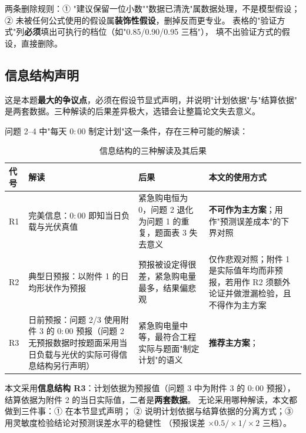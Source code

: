 \begin{guideblock}
两条删除规则：① "建议保留一位小数""数据已清洗"属数据处理，不是模型假设；
② 未被任何公式使用的假设属\textbf{装饰性假设}，删掉反而更专业。
表格的"验证方式"列\textbf{必须}填出可执行的档位（如"0.85/0.90/0.95 三档"），
填不出验证方式的假设，直接删除。
\end{guideblock}

\subsection{信息结构声明}

\begin{guideblock}
这是本题\textbf{最大的争议点}，必须在假设节显式声明，并说明"计划依据"与"结算依据"
是两套数据。三种解读的后果差异极大，选错会让整篇论文失去意义。
\end{guideblock}

问题 2--4 中"每天 \(0{:}00\) 制定计划"这一条件，存在三种可能的解读：

\begin{table}[htbp]
  \centering
  \caption{信息结构的三种解读及其后果}
  \label{tab:infostruct}
  \footnotesize
  \begin{tabularx}{\linewidth}{C{1.0cm} L{4.6cm} L{4.6cm} Y}
    \toprule
    代号 & 解读 & 后果 & 本文的使用方式 \\
    \midrule
    R1 & 完美信息：\(0{:}00\) 即知当日负载与光伏真值
       & 紧急购电恒为 0，问题 2 退化为问题 1 的重复，题面表 3 失去意义
       & \textbf{不可作为主方案}；用作"预测误差成本"的下界对照 \\
    \addlinespace
    R2 & 典型日预报：以附件 1 的日均形状作为预报
       & 预报被设定得很差，紧急购电量最多，结果偏悲观
       & 仅作悲观对照；附件 1 是实际值年均而非预报，若用作 R2 须额外论证并做泄漏检验，且不得作为主方案 \\
    \addlinespace
    R3 & 日前预报：问题 2/3 使用附件 3 的 \(0{:}00\) 预报（问题 2 无预报数据时按题面采用当日负载与光伏的实际可得信息结构另行声明）
       & 紧急购电量中等，最符合工程实际与题面"制定计划"的语义
       & \textbf{推荐主方案}； \\
    \bottomrule
  \end{tabularx}
\end{table}

本文采用\textbf{信息结构 R3}：计划依据为预报值（问题 3 中为附件 3 的 \(0{:}00\) 预报），
结算依据为附件 2 的当日实际值，二者是\textbf{两套数据}。
无论采用哪种解读，本文都做到三件事：① 在本节显式声明；
② 说明计划依据与结算依据的分离方式；③ 用灵敏度检验结论对预测误差水平的稳健性
（预报误差 \(\times 0.5/\times 1/\times 2\) 三档）。

